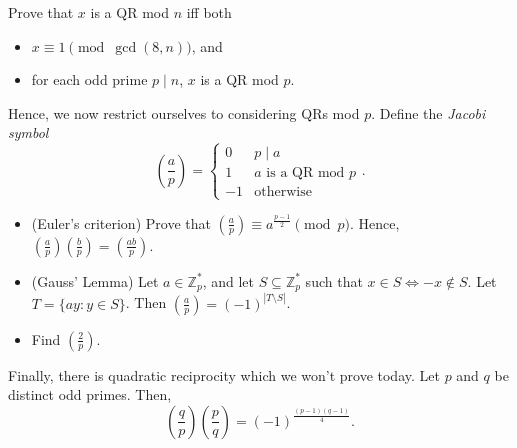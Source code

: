 \documentclass{article}
\newcommand\Zz{\mathbb{Z}}
\begin{document}
Prove that $x$ is a QR mod $n$ iff both
\begin{itemize}
  \item $x\equiv 1\pmod{\gcd(8,n)}$, and
  \item for each odd prime $p\mid n$, $x$ is a QR mod $p$.
\end{itemize}

Hence, we now restrict ourselves to considering QRs mod $p$.
Define the \emph{Jacobi symbol}
\[\left(\frac ap\right)=\begin{cases} 0&p\mid a \\ 1&a\text{ is a QR mod }p \\
-1&\text{otherwise}\end{cases}.\]

\begin{itemize}
  \item (Euler's criterion) Prove that
    $\left(\frac ap\right)\equiv a^{\frac{p-1}2}\pmod p$.
    Hence, $\left(\frac ap\right)\left(\frac
    bp\right)=\left(\frac{ab}p\right)$.
  \item (Gauss' Lemma) Let $a\in\Zz_p^*$, and let $S\subseteq\Zz_p^*$ such that $x\in S\iff
    -x\not\in S$. Let $T=\{ay:y\in S\}$. Then
    $\left(\frac ap\right)=(-1)^{|T\setminus S|}$.
  \item Find $\left(\frac 2p\right)$.
\end{itemize}

Finally, there is quadratic reciprocity which we won't prove today.
Let $p$ and $q$ be distinct odd primes. Then,
\[\left(\frac qp\right)\left(\frac pq\right)=(-1)^{\frac{(p-1)(q-1)}4}.\]
\end{document}
